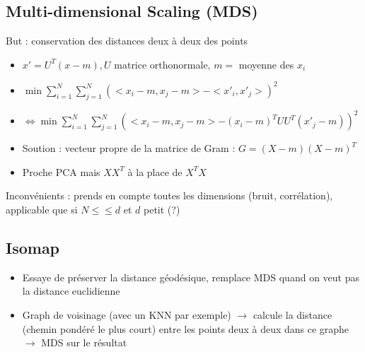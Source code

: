 \documentclass{article}
\begin{document}
\subsection{Multi-dimensional Scaling (MDS)}
But : conservation des distances deux à deux des points
\begin{itemize}
    \item $ x' = U^T(x-m), U $ matrice orthonormale, $ m = $ moyenne des $ x_i $ 
    \item $ \min \sum_{i=1}^{N} \sum_{j=1}^{N} ( < x_i - m, x_j - m> - <x'_i , x'_j> )^2 $ 
    \item $\Leftrightarrow \min \sum_{i=1}^{N} \sum_{j=1}^{N} ( < x_i - m, x_j - m> - (x_i - m )^T U U^T (x'_j - m) )^2$ 
    \item Soution : vecteur propre de la matrice de Gram : $ G = (X - m)(X - m)^T $
    \item Proche PCA mais $ XX^T $ à la place de $ X^T X $ 
\end{itemize}
Inconvénients : prends en compte toutes les dimensions (bruit, corrélation), applicable que si $ N \leq \leq d $ et $ d $ petit (?)

\subsection{Isomap}
\begin{itemize}
    \item Essaye de préserver la distance géodésique, remplace MDS quand on veut pas la distance euclidienne
    \item Graph de voisinage (avec un KNN par exemple) $\rightarrow$ calcule la distance (chemin pondéré le plus court) entre les points deux à deux dans ce graphe $\rightarrow$ MDS sur le résultat
\end{itemize}
\end{document}
